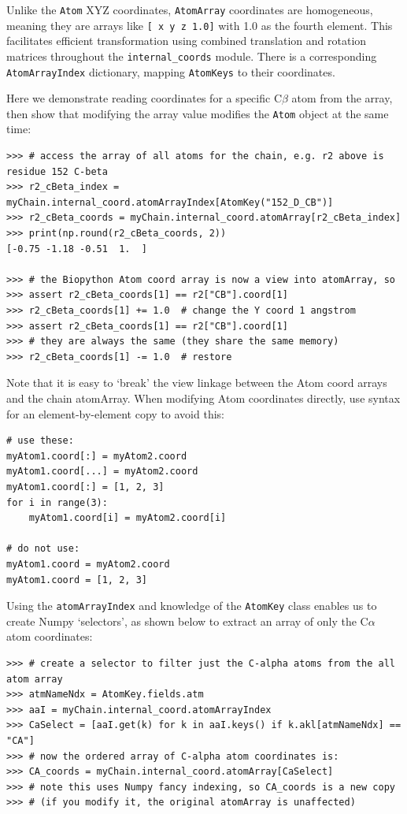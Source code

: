 Unlike the \texttt{Atom} XYZ coordinates, \texttt{AtomArray} coordinates are homogeneous, meaning
they are arrays like \texttt{[ x y z 1.0]} with 1.0 as the fourth element.  This facilitates efficient transformation using combined
translation and rotation matrices throughout the \texttt{internal\_coords} module.  There is a 
corresponding \texttt{AtomArrayIndex} dictionary, mapping \texttt{AtomKeys} to their coordinates.

Here we demonstrate reading coordinates for a specific C$\beta$ atom from the array, then show
that modifying the array value modifies the \texttt{Atom} object at the same time:

\begin{verbatim}
>>> # access the array of all atoms for the chain, e.g. r2 above is residue 152 C-beta
>>> r2_cBeta_index = myChain.internal_coord.atomArrayIndex[AtomKey("152_D_CB")]
>>> r2_cBeta_coords = myChain.internal_coord.atomArray[r2_cBeta_index]
>>> print(np.round(r2_cBeta_coords, 2))
[-0.75 -1.18 -0.51  1.  ]

>>> # the Biopython Atom coord array is now a view into atomArray, so
>>> assert r2_cBeta_coords[1] == r2["CB"].coord[1]
>>> r2_cBeta_coords[1] += 1.0  # change the Y coord 1 angstrom
>>> assert r2_cBeta_coords[1] == r2["CB"].coord[1]
>>> # they are always the same (they share the same memory)
>>> r2_cBeta_coords[1] -= 1.0  # restore
\end{verbatim}

Note that it is easy to `break' the view linkage between the Atom coord arrays and the
chain atomArray.  When modifying Atom coordinates directly, use syntax for an
element-by-element copy to avoid this:

\begin{verbatim}
# use these:
myAtom1.coord[:] = myAtom2.coord
myAtom1.coord[...] = myAtom2.coord
myAtom1.coord[:] = [1, 2, 3]
for i in range(3):
    myAtom1.coord[i] = myAtom2.coord[i]

# do not use:
myAtom1.coord = myAtom2.coord
myAtom1.coord = [1, 2, 3]
\end{verbatim}


Using the \texttt{atomArrayIndex} and knowledge of the \texttt{AtomKey} class
enables us to create Numpy `selectors', as shown below to extract an array of
only the C$\alpha$ atom coordinates:

\begin{verbatim}
>>> # create a selector to filter just the C-alpha atoms from the all atom array
>>> atmNameNdx = AtomKey.fields.atm
>>> aaI = myChain.internal_coord.atomArrayIndex
>>> CaSelect = [aaI.get(k) for k in aaI.keys() if k.akl[atmNameNdx] == "CA"]
>>> # now the ordered array of C-alpha atom coordinates is:
>>> CA_coords = myChain.internal_coord.atomArray[CaSelect]
>>> # note this uses Numpy fancy indexing, so CA_coords is a new copy
>>> # (if you modify it, the original atomArray is unaffected)
\end{verbatim}

